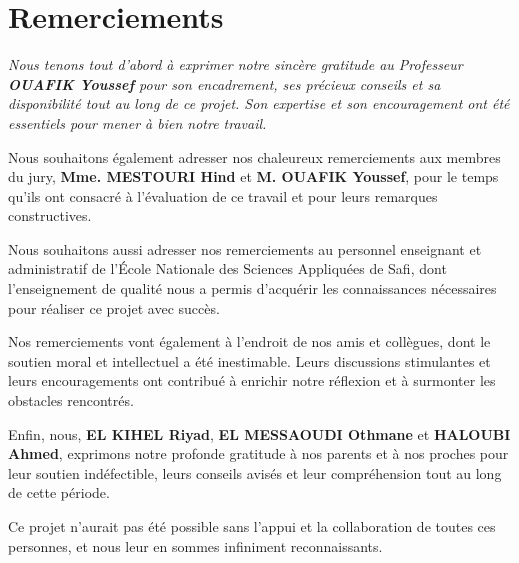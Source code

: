\documentclass[a4paper,12pt]{article}
\begin{document}
\section*{\Huge{Remerciements}}
\vspace{1cm}
{\large \itshape
Nous tenons tout d'abord à exprimer notre sincère gratitude au Professeur
{\normalsize\textbf{OUAFIK Youssef}} pour son encadrement, ses précieux conseils et sa
disponibilité tout au long de ce projet. Son expertise et son encouragement
ont été essentiels pour mener à bien notre travail.

\vspace{0.5cm}

Nous souhaitons également adresser nos chaleureux remerciements aux membres
du jury, {\normalsize\textbf{Mme. MESTOURI Hind}} et {\normalsize\textbf{M. OUAFIK Youssef}}, pour le
temps qu'ils ont consacré à l'évaluation de ce travail et pour leurs remarques
constructives.

\vspace{0.5cm}

Nous souhaitons aussi adresser nos remerciements au personnel enseignant et
administratif de l'École Nationale des Sciences Appliquées de Safi, dont
l'enseignement de qualité nous a permis d'acquérir les connaissances nécessaires
pour réaliser ce projet avec succès.

\vspace{0.5cm}

Nos remerciements vont également à l'endroit de nos amis et collègues, dont
le soutien moral et intellectuel a été inestimable. Leurs discussions stimulantes
et leurs encouragements ont contribué à enrichir notre réflexion et à surmonter
les obstacles rencontrés.

\vspace{0.5cm}

Enfin, nous, {\normalsize\textbf{EL KIHEL Riyad}}, {\normalsize\textbf{EL MESSAOUDI Othmane}} et
{\normalsize\textbf{HALOUBI Ahmed}}, exprimons notre profonde gratitude à nos parents et
à nos proches pour leur soutien indéfectible, leurs conseils avisés et leur
compréhension tout au long de cette période.

\vspace{0.5cm}

Ce projet n'aurait pas été possible sans l'appui et la collaboration de toutes
ces personnes, et nous leur en sommes infiniment reconnaissants.
}

\newpage
{}
\end{document}
